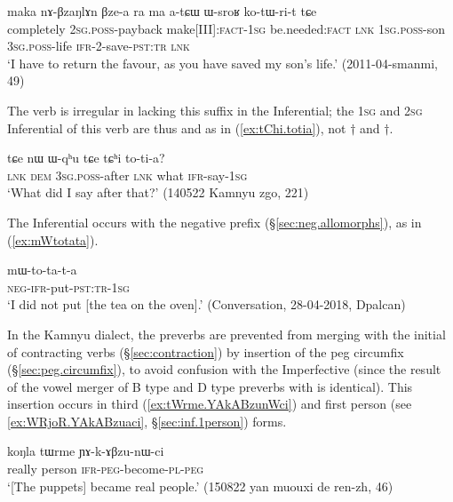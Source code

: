 \begin{exe}
\ex \label{ex:WsroR.kotWrit}
\gll maka nɤ-βzaŋlɤn βze-a ra ma a-tɕɯ ɯ-sroʁ ko-tɯ-ri-t tɕe \\
completely \textsc{2sg}.\textsc{poss}-payback make[III]:\textsc{fact}-\textsc{1sg} be.needed:\textsc{fact} \textsc{lnk} \textsc{1sg}.\textsc{poss}-son \textsc{3sg}.\textsc{poss}-life \textsc{ifr}-2-save-\textsc{pst}:\textsc{tr} \textsc{lnk} \\
\glt `I have to return the favour, as you have saved my son's life.' (2011-04-smanmi, 49)
\end{exe}

The verb  is irregular in lacking this suffix in the Inferential; the \textsc{1sg} and \textsc{2sg} Inferential of this verb are thus  and  as in (\ref{ex:tChi.totia}), not $\dagger$ and $\dagger$.

\begin{exe}
\ex \label{ex:tChi.totia}
\gll tɕe nɯ ɯ-qʰu tɕe tɕʰi to-ti-a? \\
\textsc{lnk} \textsc{dem} \textsc{3sg}.\textsc{poss}-after \textsc{lnk} what \textsc{ifr}-say-\textsc{1sg} \\
\glt `What did I say after that?' (140522 Kamnyu zgo, 221)
\end{exe}

The Inferential occurs with the negative prefix  (§\ref{sec:neg.allomorphs}), as in (\ref{ex:mWtotata}).

\begin{exe}
\ex \label{ex:mWtotata}
\gll mɯ-to-ta-t-a \\
\textsc{neg}-\textsc{ifr}-put-\textsc{pst}:\textsc{tr}-\textsc{1sg} \\
\glt `I did not put [the tea on the oven].' (Conversation, 28-04-2018, Dpalcan)
\end{exe}

In the Kamnyu dialect, the preverbs are prevented from merging with the initial  of contracting verbs (§\ref{sec:contraction}) by insertion of the peg circumfix (§\ref{sec:peg.circumfix}), to avoid confusion with the Imperfective (since the result of the vowel merger of B type and D type preverbs with  is identical). This insertion occurs in third (\ref{ex:tWrme.YAkABzunWci}) and first person (see \ref{ex:WRjoR.YAkABzuaci}, §\ref{sec:inf.1person}) forms.


\begin{exe}
\ex \label{ex:tWrme.YAkABzunWci}
\gll koŋla tɯrme ɲɤ-k-ɤβzu-nɯ-ci \\
really person \textsc{ifr}-\textsc{peg}-become-\textsc{pl}-\textsc{peg} \\
\glt `[The puppets] became real people.' (150822 yan muouxi de ren-zh, 46)
\end{exe}

